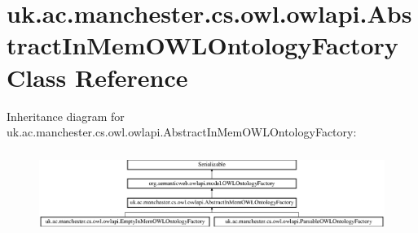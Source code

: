 \hypertarget{classuk_1_1ac_1_1manchester_1_1cs_1_1owl_1_1owlapi_1_1_abstract_in_mem_o_w_l_ontology_factory}{\section{uk.\-ac.\-manchester.\-cs.\-owl.\-owlapi.\-Abstract\-In\-Mem\-O\-W\-L\-Ontology\-Factory Class Reference}
\label{classuk_1_1ac_1_1manchester_1_1cs_1_1owl_1_1owlapi_1_1_abstract_in_mem_o_w_l_ontology_factory}
}
Inheritance diagram for uk.\-ac.\-manchester.\-cs.\-owl.\-owlapi.\-Abstract\-In\-Mem\-O\-W\-L\-Ontology\-Factory\-:\begin{figure}[H]
\begin{center}
\leavevmode
\includegraphics[height=2.725061cm]{classuk_1_1ac_1_1manchester_1_1cs_1_1owl_1_1owlapi_1_1_abstract_in_mem_o_w_l_ontology_factory}
\end{center}
\end{figure}

